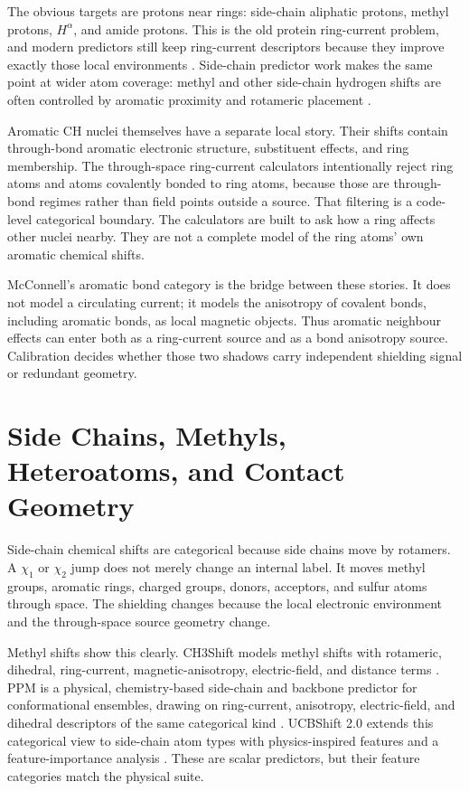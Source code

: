 \documentclass[11pt]{article}
\begin{document}
The obvious targets are protons near rings: side-chain aliphatic protons,
methyl protons, \(H^\alpha\), and amide protons. This is the old protein
ring-current problem, and modern predictors still keep ring-current descriptors
because they improve exactly those local environments
\cite{neal2003,shenbax2007,christensen2011,ptaszek2024}. Side-chain predictor
work makes the same point at wider atom coverage: methyl and other side-chain
hydrogen shifts are often controlled by aromatic proximity and rotameric
placement \cite{sahakyan2011,li2012,ptaszek2024}.

Aromatic CH nuclei themselves have a separate local story. Their shifts contain
through-bond aromatic electronic structure, substituent effects, and ring
membership. The through-space ring-current calculators intentionally reject
ring atoms and atoms covalently bonded to ring atoms, because those are
through-bond regimes rather than field points outside a source. That filtering
is a code-level categorical boundary. The calculators are built to ask how a
ring affects other nuclei nearby. They are not a complete model of the ring
atoms' own aromatic chemical shifts.

McConnell's aromatic bond category is the bridge between these stories. It
does not model a circulating current; it models the anisotropy of covalent
bonds, including aromatic bonds, as local magnetic objects. Thus aromatic
neighbour effects can enter both as a ring-current source and as a bond
anisotropy source. Calibration decides whether those two shadows carry
independent shielding signal or redundant geometry.

\section{Side Chains, Methyls, Heteroatoms, and Contact Geometry}

Side-chain chemical shifts are categorical because side chains move by rotamers.
A \(\chi_1\) or \(\chi_2\) jump does not merely change an internal label. It
moves methyl groups, aromatic rings, charged groups, donors, acceptors, and
sulfur atoms through space. The shielding changes because the local electronic
environment and the through-space source geometry change.

Methyl shifts show this clearly. CH3Shift models methyl shifts with rotameric,
dihedral, ring-current, magnetic-anisotropy, electric-field, and distance terms
\cite{sahakyan2011}. PPM is a physical, chemistry-based side-chain and backbone
predictor for conformational ensembles, drawing on ring-current, anisotropy,
electric-field, and dihedral descriptors of the same categorical kind
\cite{li2012}. UCBShift 2.0 extends this categorical view to
side-chain atom types with physics-inspired features and a feature-importance
analysis \cite{ptaszek2024}. These are
scalar predictors, but their feature categories match the physical suite.
\end{document}
